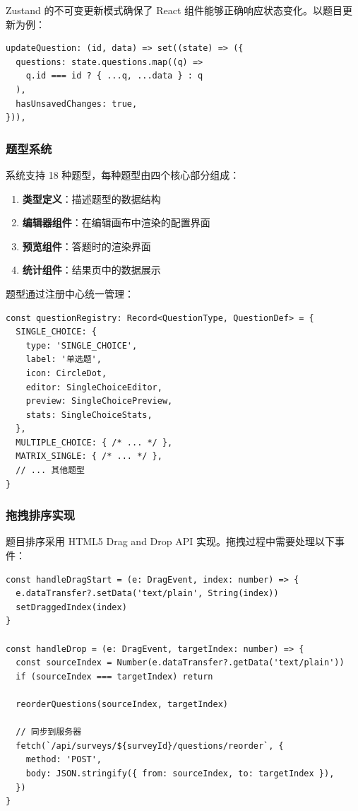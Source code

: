 Zustand 的不可变更新模式确保了 React 组件能够正确响应状态变化。以题目更新为例：

\begin{verbatim}
updateQuestion: (id, data) => set((state) => ({
  questions: state.questions.map((q) =>
    q.id === id ? { ...q, ...data } : q
  ),
  hasUnsavedChanges: true,
})),
\end{verbatim}

\subsubsection{题型系统}

系统支持 18 种题型，每种题型由四个核心部分组成：

\begin{enumerate}[label=(\arabic*)]
  \item \textbf{类型定义}：描述题型的数据结构
  \item \textbf{编辑器组件}：在编辑画布中渲染的配置界面
  \item \textbf{预览组件}：答题时的渲染界面
  \item \textbf{统计组件}：结果页中的数据展示
\end{enumerate}

题型通过注册中心统一管理：

\begin{verbatim}
const questionRegistry: Record<QuestionType, QuestionDef> = {
  SINGLE_CHOICE: {
    type: 'SINGLE_CHOICE',
    label: '单选题',
    icon: CircleDot,
    editor: SingleChoiceEditor,
    preview: SingleChoicePreview,
    stats: SingleChoiceStats,
  },
  MULTIPLE_CHOICE: { /* ... */ },
  MATRIX_SINGLE: { /* ... */ },
  // ... 其他题型
}
\end{verbatim}

\subsubsection{拖拽排序实现}

题目排序采用 HTML5 Drag and Drop API 实现。拖拽过程中需要处理以下事件：

\begin{verbatim}
const handleDragStart = (e: DragEvent, index: number) => {
  e.dataTransfer?.setData('text/plain', String(index))
  setDraggedIndex(index)
}

const handleDrop = (e: DragEvent, targetIndex: number) => {
  const sourceIndex = Number(e.dataTransfer?.getData('text/plain'))
  if (sourceIndex === targetIndex) return
  
  reorderQuestions(sourceIndex, targetIndex)
  
  // 同步到服务器
  fetch(`/api/surveys/${surveyId}/questions/reorder`, {
    method: 'POST',
    body: JSON.stringify({ from: sourceIndex, to: targetIndex }),
  })
}
\end{verbatim}

